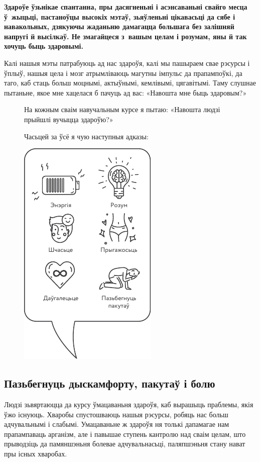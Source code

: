\textbf{Здароўе ўзьнікае спантанна, пры дасягненьні і асэнсаваньні свайго месца ў~жыцьці, пастаноўцы высокіх мэтаў, зьяўленьні цікавасьці да сябе і навакольных, дзякуючы жаданьню дамагацца большага без залішняй напругі й высілкаў. Не змагайцеся з~вашым целам і розумам, яны й так хочуць быць здаровымі.}

Калі нашыя мэты патрабуюць ад нас здароўя, калі мы пашыраем свае рэсурсы і ўплыў, нашыя цела і мозг атрымліваюць магутны імпульс да прапампоўкі, да таго, каб стаць больш моцнымі, актыўнымі, кемлівымі, цягавітымі. Таму слушнае пытаньне, якое мне хацелася б пачуць ад вас: «Навошта мне быць здаровым?» 

\begin{figure}[htb!]
  \raggedright
  На кожным сваім навучальным курсе я пытаю: «Навошта людзі прыйшлі вучыцца здароўю?» 
  
  Часьцей за ўсё я чую наступныя адказы:\medskip

  \centering
  \includegraphics[scale=1.5]{willpower/ch1/1.pdf}
\end{figure}

\subsection*{Пазьбегнуць дыскамфорту, пакутаў і болю}

Людзі зьвяртаюцца да курсу ўмацаваньня здароўя, каб вырашыць праблемы, якія ўжо існуюць. Хваробы спустошваюць нашыя рэсурсы, робяць нас больш адчувальнымі і слабымі. Умацаваньне ж здароўя ня толькі дапамагае нам прапампаваць арганізм, але і павышае ступень кантролю над сваім целам, што прыводзіць да памяншэньня болевае адчувальнасьці, паляпшэньня стану нават пры існых хваробах.

